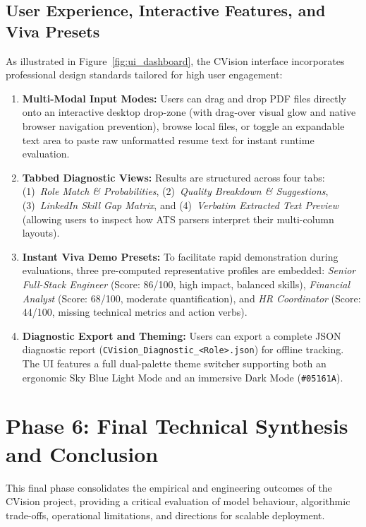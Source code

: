 \documentclass[11pt,a4paper]{article}
\begin{document}
\subsection{User Experience, Interactive Features, and Viva Presets}
\label{sec:ux_features}

As illustrated in Figure~\ref{fig:ui_dashboard}, the CVision interface incorporates
professional design standards tailored for high user engagement:

\begin{enumerate}
  \item \textbf{Multi-Modal Input Modes:} Users can drag and drop PDF files directly
  onto an interactive desktop drop-zone (with drag-over visual glow and native browser
  navigation prevention), browse local files, or toggle an expandable text area to
  paste raw unformatted resume text for instant runtime evaluation.
  \item \textbf{Tabbed Diagnostic Views:} Results are structured across four tabs:
  (1)~\emph{Role Match \& Probabilities}, (2)~\emph{Quality Breakdown \& Suggestions},
  (3)~\emph{LinkedIn Skill Gap Matrix}, and (4)~\emph{Verbatim Extracted Text Preview}
  (allowing users to inspect how ATS parsers interpret their multi-column layouts).
  \item \textbf{Instant Viva Demo Presets:} To facilitate rapid demonstration during
  evaluations, three pre-computed representative profiles are embedded:
  \emph{Senior Full-Stack Engineer} (Score: 86/100, high impact, balanced skills),
  \emph{Financial Analyst} (Score: 68/100, moderate quantification), and
  \emph{HR Coordinator} (Score: 44/100, missing technical metrics and action verbs).
  \item \textbf{Diagnostic Export and Theming:} Users can export a complete JSON
  diagnostic report (\texttt{CVision\_Diagnostic\_<Role>.json}) for offline tracking.
  The UI features a full dual-palette theme switcher supporting both an ergonomic
  Sky Blue Light Mode and an immersive Dark Mode (\texttt{\#05161A}).
\end{enumerate}


\section{Phase 6: Final Technical Synthesis and Conclusion}
\label{sec:phase6}

This final phase consolidates the empirical and engineering outcomes of the
CVision project, providing a critical evaluation of model behaviour, algorithmic
trade-offs, operational limitations, and directions for scalable deployment.
\end{document}
